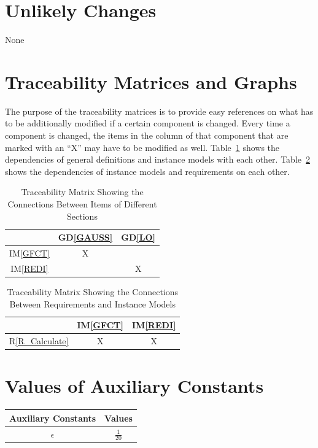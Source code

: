 \documentclass[12pt]{article}
\newcommand{\dref}[1]{GD\ref{#1}}
\newcommand{\iref}[1]{IM\ref{#1}}
\newcommand{\rref}[1]{R\ref{#1}}
\begin{document}
\section{Unlikely Changes}    

None

\section{Traceability Matrices and Graphs}

The purpose of the traceability matrices is to provide easy references on what
has to be additionally modified if a certain component is changed.  Every time a
component is changed, the items in the column of that component that are marked
with an ``X'' may have to be modified as well.  Table~\ref{Table:trace} shows the
dependencies of  general definitions and instance models with each other. 
Table~\ref{Table:R_trace} shows the dependencies of instance models and requirements on each other. 

\begin{table}[h!]
\centering
\begin{tabular}{|c|c|c|}
\hline        
	& \dref{GAUSS} & \dref{LO} \\
\hline
\iref{GFCT} & X &  \\ \hline
\iref{REDI} &   & X \\
\hline
\end{tabular}
\caption{Traceability Matrix Showing the Connections Between Items of Different Sections}
\label{Table:trace}
\end{table}

\begin{table}[h!]
\centering
\begin{tabular}{|c|c|c|}
\hline
	& \iref{GFCT} & \iref{REDI} \\
\hline
\rref{R_Calculate}   & X & X \\ 
\hline
\end{tabular}
\caption{Traceability Matrix Showing the Connections Between Requirements and Instance Models}
\label{Table:R_trace}
\end{table}

\section{Values of Auxiliary Constants}

\begin{table}[h!]
  \centering
  \begin{tabular}{|c|c|}
  \hline
  Auxiliary Constants & Values \\
  \hline
  $\epsilon$  & $\frac{1}{20}$ \\ 
  \hline
  \end{tabular}
  \label{Table:Values}
  \end{table}
\end{document}
